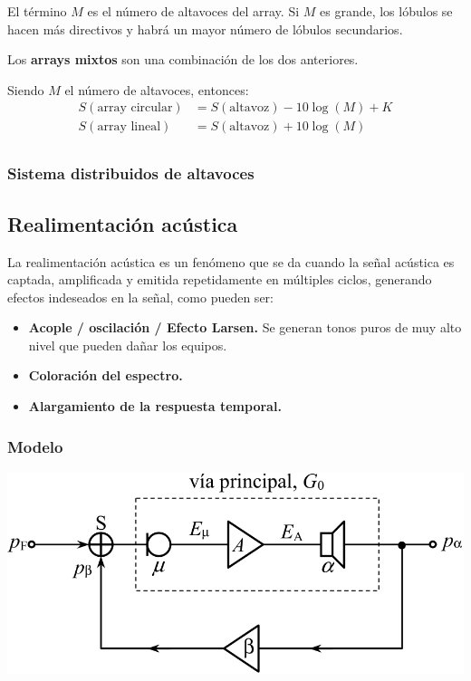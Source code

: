 \documentclass[a4paper, 8pt]{extarticle}
\begin{document}
\begin{multicols}{3}
  El término $M$ es el número de altavoces del array. Si $M$ es grande, los lóbulos se hacen más directivos y habrá un mayor número de lóbulos secundarios.

  Los \textbf{arrays mixtos} son una combinación de los dos anteriores.

  Siendo $M$ el número de altavoces, entonces:
  \begin{align*}
    S \left( \text{array circular} \right) & = S \left( \text{altavoz} \right) - 10 \log \left( M \right) + K \\
    S \left( \text{array lineal} \right)   & = S \left( \text{altavoz} \right) + 10 \log \left( M \right)     \\
  \end{align*}

  \subsubsection{Sistema distribuidos de altavoces}
  \subsection{Realimentación acústica}

  La realimentación acústica es un fenómeno que se da cuando la señal acústica es captada, amplificada y emitida repetidamente en múltiples ciclos, generando efectos indeseados en la señal, como pueden ser:
  \begin{itemize}
    \item \textbf{Acople / oscilación / Efecto Larsen.} Se generan tonos puros de muy alto nivel que pueden dañar los equipos.
    \item \textbf{Coloración del espectro.}
    \item \textbf{Alargamiento de la respuesta temporal.}
  \end{itemize}

  \subsubsection{Modelo}
  \begin{center}
    \includegraphics[width=0.7\linewidth]{Acople.png}
  \end{center}


\end{multicols}
\end{document}

